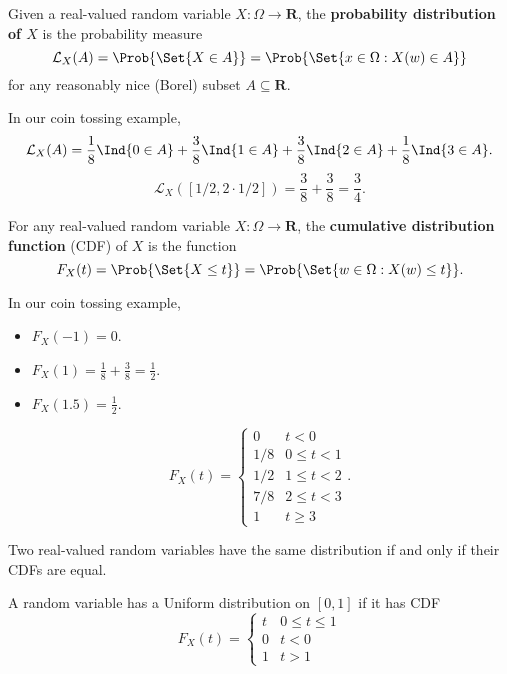 \begin{Definition}{}{}
    Given a real-valued random variable $ X\colon \Omega\to\mathbf{R} $,
    the \textbf{probability distribution of $ X $} is the probability
    measure
    \[ \mathcal{L}_X(A)=\Prob{\Set{X\in A}}=
        \Prob{\Set{x\in \Omega:X(w)\in A}} \]
    for any reasonably nice (Borel) subset $ A\subseteq\mathbf{R} $.
\end{Definition}
\begin{Example}{}{}
    In our coin tossing example,
    \[ \mathcal{L}_X(A)=\frac{1}{8}\Ind{0\in A}+
        \frac{3}{8}\Ind{1\in A}+\frac{3}{8}\Ind{2\in A}+\frac{1}{8}\Ind{3\in A}. \]
    \[ \mathcal{L}_X([1/2,2\cdot 1/2])=\frac{3}{8}+\frac{3}{8}=\frac{3}{4}. \]
\end{Example}
\begin{Definition}{}{}
    For any real-valued random variable
    $ X\colon \Omega\to\mathbf{R} $, the \textbf{cumulative distribution function}
    (CDF) of $ X $ is the function
    \[ F_X(t)=\Prob{\Set{X\le t}}=\Prob{\Set{w\in \Omega:X(w)\le t}}. \]
\end{Definition}
\begin{Example}{}{}
    In our coin tossing example,
    \begin{itemize}
        \item $ F_X(-1)=0 $.
        \item $ F_X(1)=\frac{1}{8}+\frac{3}{8}=\frac{1}{2} $.
        \item $ F_X(1.5)=\frac{1}{2} $.
    \end{itemize}
    \[ F_X(t)=
        \begin{cases}
            0   & t<0      \\
            1/8 & 0\le t<1 \\
            1/2 & 1\le t<2 \\
            7/8 & 2\le t<3 \\
            1   & t\ge 3
        \end{cases}. \]
\end{Example}
\begin{Theorem}{}{}
    Two real-valued random variables have the same distribution
    if and only if their CDFs are equal.
\end{Theorem}
\begin{Definition}{}{}
    A random variable has a Uniform distribution on $ [0,1] $
    if it has CDF
    \[ F_X(t)=\begin{cases}
            t & 0\le t\le 1 \\
            0 & t<0         \\
            1 & t>1
        \end{cases} \]
\end{Definition}
